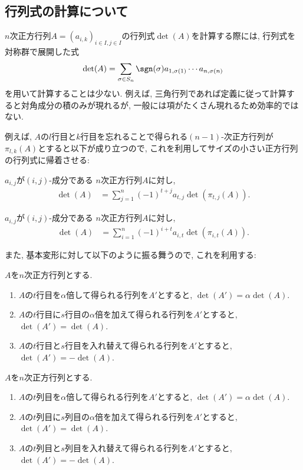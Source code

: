 \subsection{行列式の計算について}

$n$次正方行列$A=(a_{i,k})_{i\in I,j\in I}$の行列式$\det(A)$を計算する際には,
行列式を対称群で展開した式
\begin{align*}
\det(A)=\sum_{\sigma\in S_n} \sgn(\sigma)a_{1,\sigma(1)}\cdots a_{n,\sigma(n)}
\end{align*}
を用いて計算することは少ない.
例えば, 三角行列であれば定義に従って計算すると対角成分の積のみが現れるが,
一般には項がたくさん現れるため効率的ではない.

例えば,
$A$の$l$行目と$k$行目を忘れることで得られる$(n-1)$-次正方行列が$\pi_{l,k}(A)$とすると以下が成り立つので,
これを利用してサイズの小さい正方行列の行列式に帰着させる:
\begin{theorem}
  \label{thm:det:row:expansion}
  $a_{i,j}$が$(i,j)$-成分である
    $n$次正方行列$A$に対し,
    \begin{align*}
      \det(A)&=
      \sum_{j=1}^{n}
      (-1)^{t+j}a_{t,j}\det(\pi_{t,j}(A)).
    \end{align*}
\end{theorem}
\begin{theorem}
  \label{thm:det:col:expansion}
  $a_{i,j}$が$(i,j)$-成分である
    $n$次正方行列$A$に対し,
    \begin{align*}
      \det(A)&=\sum_{i=1}^{n}
      (-1)^{i+t}a_{i,t}\det(\pi_{i,t}(A)).
    \end{align*}
\end{theorem}

また,
基本変形に対して以下のように振る舞うので,
これを利用する:
\begin{theorem}
  $A$を$n$次正方行列とする.
  \begin{enumerate}
  \item 

    $A$の$t$行目を$\alpha$倍して得られる行列を$A'$とすると,
    $\det(A')=\alpha \det(A)$.
  \item 
    $A$の$t$行目に$s$行目の$\alpha$倍を加えて得られる行列を$A'$とすると,
    $\det(A')=\det(A)$.
  \item 
    $A$の$t$行目と$s$行目を入れ替えて得られる行列を$A'$とすると,
    $\det(A')=-\det(A)$.
  \end{enumerate}
\end{theorem}
\begin{theorem}
  $A$を$n$次正方行列とする.
  \begin{enumerate}
  \item 
    $A$の$t$列目を$\alpha$倍して得られる行列を$A'$とすると,
    $\det(A')=\alpha \det(A)$.
  \item 
    $A$の$t$列目に$s$列目の$\alpha$倍を加えて得られる行列を$A'$とすると,
    $\det(A')=\det(A)$.
  \item 
    $A$の$t$列目と$s$列目を入れ替えて得られる行列を$A'$とすると,
    $\det(A')=-\det(A)$.
  \end{enumerate}
\end{theorem}

